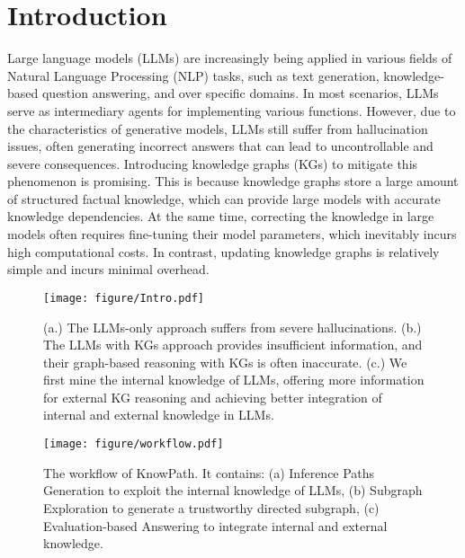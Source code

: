 \section{Introduction}

Large language models (LLMs) are increasingly being applied in various fields of Natural Language Processing (NLP) tasks, such as text generation\cite{text1,text2}, knowledge-based question answering\cite{chatkbqa,qa1}, and over specific domains\cite{special1,special2}. In most scenarios, LLMs serve as intermediary agents for implementing various functions\cite{agent1,agent2,agent3}. However, due to the characteristics of generative models, LLMs still suffer from hallucination issues, often generating incorrect answers that can lead to uncontrollable and severe consequences\cite{hallucinations1}. 
Introducing knowledge graphs (KGs) to mitigate this phenomenon is promising\cite{survey}. This is because knowledge graphs store a large amount of structured factual knowledge, which can provide large models with accurate knowledge dependencies. At the same time, correcting the knowledge in large models often requires fine-tuning their model parameters, which inevitably incurs high computational costs\cite{tog}. In contrast, updating knowledge graphs is relatively simple and incurs minimal overhead.


\begin{figure}[t]
  \centering
    \texttt{[image: figure/Intro.pdf]}
  \caption{(a.) The LLMs-only approach suffers from severe hallucinations. (b.) The LLMs with KGs approach provides insufficient information, and their graph-based reasoning with KGs is often inaccurate. (c.) We first mine the internal knowledge of LLMs, offering more information for external KG reasoning and achieving better integration of internal and external knowledge in LLMs.}
  \label{fig:Insight}
\end{figure}
\begin{figure*}[t]
  \centering
    \texttt{[image: figure/workflow.pdf]}
  \caption{The workflow of KnowPath. It contains: (a) Inference Paths Generation to exploit the internal knowledge of LLMs, (b)
  Subgraph Exploration to generate a trustworthy directed subgraph, (c) Evaluation-based Answering to integrate internal and external knowledge.}
  \label{fig:workflow}
\end{figure*}

